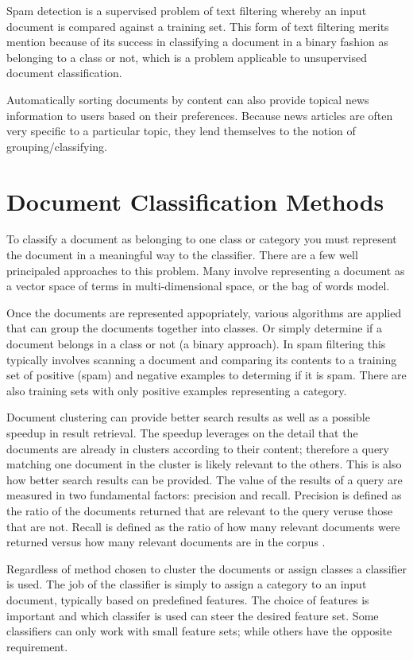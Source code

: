 \documentclass[11pt,twocolumn]{article}
\begin{document}
Spam detection is a supervised problem of text filtering whereby an input document is compared against a training set.  This form of text filtering merits mention because of its success in classifying a document in a binary fashion as belonging to a class or not, which is a problem applicable to unsupervised document classification.

Automatically sorting documents by content can also provide topical news information to users based on their preferences.  Because news articles are often very specific to a particular topic, they lend themselves to the notion of grouping/classifying.

\section{Document Classification Methods}
To classify a document as belonging to one class or category you must represent the document in a meaningful way to the classifier.  There are a few well principaled approaches to this problem.  Many involve representing a document as a vector space of terms in multi-dimensional space, or the bag of words model.

Once the documents are represented appopriately, various algorithms are applied that can group the documents together into classes.  Or simply determine if a document belongs in a class or not (a binary approach).  In spam filtering this typically involves scanning a document and comparing its contents to a training set of positive (spam) and negative examples to determing if it is spam.  There are also training sets with only positive examples representing a category.

Document clustering can provide better search results as well as a possible speedup in result retrieval.  The speedup leverages on the detail that the documents are already in clusters according to their content; therefore a query matching one document in the cluster is likely relevant to the others.  This is also how better search results can be provided.  The value of the results of a query are measured in two fundamental factors: precision and recall.  Precision is defined as the ratio of the documents returned that are relevant to the query veruse those that are not.  Recall is defined as the ratio of how many relevant documents were returned versus how many relevant documents are in the corpus \cite{Mann2008}.

Regardless of method chosen to cluster the documents or assign classes a classifier is used.  The job of the classifier is simply to assign a category to an input document, typically based on predefined features.  The choice of features is important and which classifer is used can steer the desired feature set.  Some classifiers can only work with small feature sets; while others have the opposite requirement.
\end{document}
